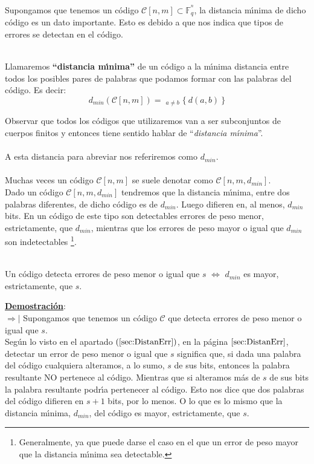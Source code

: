 Supongamos que tenemos un c\'odigo $\mathcal{C}[n,m]\subset \mathbb{F}^{^n}_q$,
la distancia m\'{\i}nima de dicho c\'odigo es un dato importante. Esto es 
debido a que nos indica que tipos de errores se detectan en el c\'odigo.
\begin{definicion}
\ \\
Llamaremos \textbf{``distancia m\'{\i}nima''} de un c\'odigo a la m\'{\i}nima
distancia entre todos los posibles pares de palabras que podamos formar con
las palabras del c\'odigo. Es decir:
\begin{displaymath}
d_{min} (\mathcal{C}[n,m]) = \mathop{\min_{a,b\in \mathcal{C}[n,m]}}_{a\neq b}
\{ \ d(a,b)\ \}
\end{displaymath}
\end{definicion}
Observar que todos los c\'odigos que utilizaremos van a ser subconjuntos de
cuerpos finitos y entonces tiene sentido hablar de ``\emph{distancia
m\'{\i}nima}''.\\ \\
%
A esta distancia para abreviar nos referiremos como $d_{min}$.\\ \\
%
Muchas veces un c\'odigo $\mathcal{C}[n,m]$ se suele denotar como
$\mathcal{C}[n,m,d_{min}]$.\\

Dado un c\'odigo $\mathcal{C}[n,m,d_{min}]$ tendremos que la distancia
m\'{\i}nima, entre dos palabras diferentes, de dicho c\'odigo es de $d_{min}$.
Luego difieren en, al menos, $d_{min}$ bits. En un c\'odigo de este tipo son
detectables errores de peso menor, estrictamente, que $d_{min}$, mientras que
los errores de peso mayor o igual que $d_{min}$ son indetectables%
\footnote{Generalmente, ya
que puede darse el caso en el que un error de peso mayor que la distancia
m\'{\i}nima sea detectable.}.
%
%
%
\begin{teorema}\label{the:Deteccion}
\ \\
Un c\'odigo detecta errores de peso menor o igual que $s$ $\Longleftrightarrow$
$d_{min}$ es mayor, estrictamente, que $s$.
\end{teorema}
\underline{\textbf{Demostraci\'on}}:\\

$\Rightarrow |$ Supongamos que tenemos un c\'odigo $\mathcal{C}$ que detecta
errores de peso menor o igual que $s$.\\

Seg\'un lo visto en el apartado $(\ref{sec:DistanErr})$, en la p\'agina
$\pageref{sec:DistanErr}$, detectar un error de peso menor o igual que $s$
significa que, si dada una palabra del c\'odigo cualquiera alteramos, a
lo sumo, $s$ de sus bits, entonces la palabra resultante NO pertenece al
c\'odigo. Mientras que si alteramos m\'as de $s$ de sus bits la palabra
resultante podr\'{\i}a pertenecer al c\'odigo. Esto nos dice que dos palabras
del c\'odigo difieren en $s+1$ bits, por lo menos. O lo que es lo mismo que
la distancia m\'{\i}nima, $d_{min}$, del c\'odigo es mayor, estrictamente, que
$s$.\\

